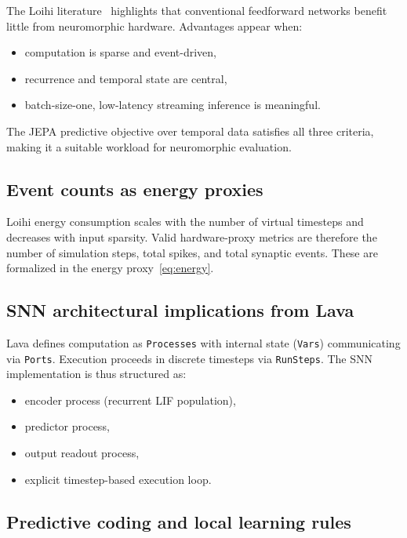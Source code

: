 \documentclass[11pt,a4paper]{article}
\begin{document}
The Loihi literature~\cite{davies2018loihi,orchard2021loihi2} highlights
that conventional feedforward networks
benefit little from neuromorphic hardware.  Advantages appear when:

\begin{itemize}[nosep]
\item computation is sparse and event-driven,
\item recurrence and temporal state are central,
\item batch-size-one, low-latency streaming inference is meaningful.
\end{itemize}

The JEPA predictive objective over temporal data satisfies all three
criteria, making it a suitable workload for neuromorphic evaluation.

\subsection{Event counts as energy proxies}

Loihi energy consumption scales with the number of virtual timesteps and
decreases with input sparsity.  Valid hardware-proxy metrics are therefore
the number of simulation steps, total spikes, and total synaptic events.
These are formalized in the energy proxy~\eqref{eq:energy}.

\subsection{SNN architectural implications from Lava}

Lava defines computation as \texttt{Processes} with internal state
(\texttt{Vars}) communicating via \texttt{Ports}.  Execution proceeds in
discrete timesteps via \texttt{RunSteps}.  The SNN implementation is thus
structured as:

\begin{itemize}[nosep]
\item encoder process (recurrent LIF population),
\item predictor process,
\item output readout process,
\item explicit timestep-based execution loop.
\end{itemize}

\subsection{Predictive coding and local learning rules}
\end{document}

